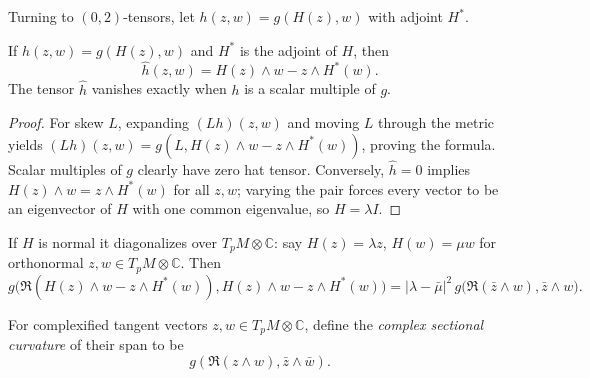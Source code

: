Turning to $(0,2)$-tensors, let $h(z,w)=g(H(z),w)$ with adjoint $H^*$.

\begin{proposition}
  \label{prop:pet-ch9-02tensor-hat-formula}

  If $h(z,w)=g(H(z),w)$ and $H^*$ is the adjoint of $H$, then
  \[
    \hat h(z,w)=H(z)\wedge w-z\wedge H^*(w).
  \]
  The tensor $\hat h$ vanishes exactly when $h$ is a scalar multiple of $g$.
\end{proposition}
\begin{proof}
  \sketch
  For skew \(L\), expanding \((Lh)(z,w)\) and moving \(L\) through the metric
  yields
  \((Lh)(z,w)=g(L,H(z)\wedge w-z\wedge H^*(w))\), proving the formula.
  Scalar multiples of \(g\) clearly have zero hat tensor.  Conversely,
  \(\hat h=0\) implies
  \(H(z)\wedge w=z\wedge H^*(w)\) for all \(z,w\); varying the pair forces
  every vector to be an eigenvector of \(H\) with one common eigenvalue, so
  \(H=\lambda I\).
\end{proof}

If $H$ is normal it diagonalizes over $T_pM\otimes\mathbb{C}$: say $H(z)=\lambda z$,
$H(w)=\mu w$ for orthonormal $z,w\in T_pM\otimes\mathbb{C}$. Then
\[
  g\big(\mathfrak{R}(H(z)\wedge w-z\wedge H^*(w)),H(z)\wedge w-z\wedge H^*(w)\big)
  =|\lambda-\bar\mu|^2\,g\big(\mathfrak{R}(\bar z\wedge w),\bar z\wedge w\big).
\]

\begin{definition}
  \label{def:pet-ch9-complex-sectional-curvature}

  For complexified tangent vectors $z,w\in T_pM\otimes\mathbb C$, define the
  \emph{complex sectional curvature} of their span to be
  \[
    g(\mathfrak R(z\wedge w),\bar z\wedge\bar w).
  \]
\end{definition}

